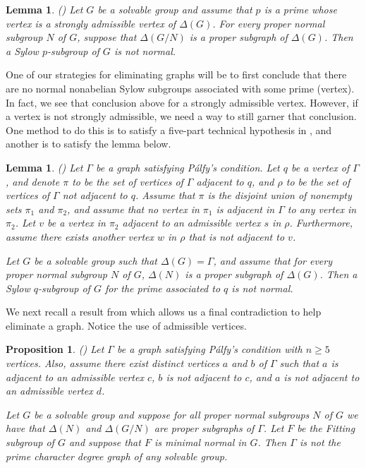 \documentclass[11pt]{amsart}
\newtheorem{lemma}[theorem]{Lemma}
\newtheorem{proposition}[theorem]{Proposition}
\theoremstyle{definition}
\theoremstyle{remark}
\numberwithin{equation}{section}
\begin{document}
\begin{lemma}\label{strong}\emph{(\cite{BLL2})}
Let $G$ be a solvable group and assume that $p$ is a prime whose vertex is a strongly admissible vertex of $\Delta(G)$. For every proper normal subgroup $N$ of $G$, suppose that $\Delta(G/N)$ is a proper subgraph of $\Delta(G)$. Then a Sylow $p$-subgroup of $G$ is not normal.
\end{lemma}

One of our strategies for eliminating graphs will be to first conclude that there are no normal nonabelian Sylow subgroups associated with some prime (vertex). In fact, we see that conclusion above for a strongly admissible vertex. However, if a vertex is not strongly admissible, we need a way to still garner that conclusion. One method to do this is to satisfy a five-part technical hypothesis in \cite{BLL3}, and another is to satisfy the lemma below.

\begin{lemma}\label{pi}\emph{(\cite{BLL2})}
Let $\Gamma$ be a graph satisfying P\'alfy's condition. Let $q$ be a vertex of $\Gamma$, and denote $\pi$ to be the set of vertices of $\Gamma$ adjacent to $q$, and $\rho$ to be the set of vertices of $\Gamma$ not adjacent to $q$. Assume that $\pi$ is the disjoint union of nonempty sets $\pi_1$ and $\pi_2$, and assume that no vertex in $\pi_1$ is adjacent in $\Gamma$ to any vertex in $\pi_2$. Let $v$ be a vertex in $\pi_2$ adjacent to an admissible vertex $s$ in $\rho$. Furthermore, assume there exists another vertex $w$ in $\rho$ that is not adjacent to $v$.

Let $G$ be a solvable group such that $\Delta(G)=\Gamma$, and assume that for every proper normal subgroup $N$ of $G$, $\Delta(N)$ is a proper subgraph of $\Delta(G)$. Then a Sylow $q$-subgroup of $G$ for the prime associated to $q$ is not normal.
\end{lemma}

We next recall a result from \cite{BLL2} which allows us a final contradiction to help eliminate a graph. Notice the use of admissible vertices.

\begin{proposition}\label{final}\emph{(\cite{BLL2})}
Let $\Gamma$ be a graph satisfying P\'alfy's condition with $n\geq5$ vertices. Also, assume there exist distinct vertices $a$ and $b$ of $\Gamma$ such that $a$ is adjacent to an admissible vertex $c$, $b$ is not adjacent to $c$, and $a$ is not adjacent to an admissible vertex $d$.

Let $G$ be a solvable group and suppose for all proper normal subgroups $N$ of $G$ we have that $\Delta(N)$ and $\Delta(G/N)$ are proper subgraphs of $\Gamma$. Let $F$ be the Fitting subgroup of $G$ and suppose that $F$ is minimal normal in $G$. Then $\Gamma$ is not the prime character degree graph of any solvable group.
\end{proposition}
\end{document}

